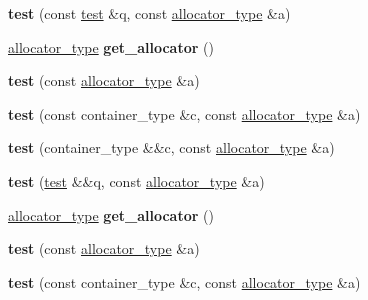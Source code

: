 \begin{DoxyCompactItemize}
\item 
\mbox{\label{structtest_a45659601f1451323c8a53cdb6a1c2a86}} 
{\bfseries test} (const \mbox{\hyperlink{structtest}{test}} \&q, const \mbox{\hyperlink{classtest__allocator}{allocator\+\_\+type}} \&a)
\item 
\mbox{\label{structtest_ac118a5169aefd32532363da721910981}} 
\mbox{\hyperlink{classtest__allocator}{allocator\+\_\+type}} {\bfseries get\+\_\+allocator} ()
\item 
\mbox{\label{structtest_a4ecc4aa80f049dc8824bfe0f4ec1bfcb}} 
{\bfseries test} (const \mbox{\hyperlink{classtest__allocator}{allocator\+\_\+type}} \&a)
\item 
\mbox{\label{structtest_a570b32b3abcc801ed80d0ebca4831bcf}} 
{\bfseries test} (const container\+\_\+type \&c, const \mbox{\hyperlink{classtest__allocator}{allocator\+\_\+type}} \&a)
\item 
\mbox{\label{structtest_aef6ed044b832639007cc1d24832f1270}} 
{\bfseries test} (container\+\_\+type \&\&c, const \mbox{\hyperlink{classtest__allocator}{allocator\+\_\+type}} \&a)
\item 
\mbox{\label{structtest_af196249915ea3bdf67539228ebab8fd6}} 
{\bfseries test} (\mbox{\hyperlink{structtest}{test}} \&\&q, const \mbox{\hyperlink{classtest__allocator}{allocator\+\_\+type}} \&a)
\item 
\mbox{\label{structtest_ac118a5169aefd32532363da721910981}} 
\mbox{\hyperlink{classtest__allocator}{allocator\+\_\+type}} {\bfseries get\+\_\+allocator} ()
\item 
\mbox{\label{structtest_a4ecc4aa80f049dc8824bfe0f4ec1bfcb}} 
{\bfseries test} (const \mbox{\hyperlink{classtest__allocator}{allocator\+\_\+type}} \&a)
\item 
\mbox{\label{structtest_a570b32b3abcc801ed80d0ebca4831bcf}} 
{\bfseries test} (const container\+\_\+type \&c, const \mbox{\hyperlink{classtest__allocator}{allocator\+\_\+type}} \&a)
\item 
\mbox{\label{structtest_aef6ed044b832639007cc1d24832f1270}} 

\end{DoxyCompactItemize}
